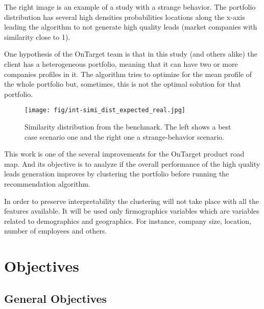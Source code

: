 The right image is an example of a study with a strange behavior. The portfolio distribution has several high densities probabilities locations along the x-axis leading the algorithm to not generate high quality leads (market companies with similarity close to 1). 

One hypothesis of the OnTarget team is that in this study (and others alike) the client has a heterogeneous portfolio, meaning that it can have two or more companies profiles in it. The algorithm tries to optimize for the mean profile of the whole portfolio but, sometimes, this is not the optimal solution for that portfolio.

\begin{figure}
   \centering
   \texttt{[image: fig/int-simi\_dist\_expected\_real.jpg]} 
   \caption{Similarity distribution from the benchmark. The left shows a best case scenario one and the right one a strange-behavior scenario.}
   \label{fig:simi_dist_expected_real}
\end{figure}

This work is one of the several improvements for the OnTarget product road map. And its objective is to analyze if the overall performance of the high quality leads generation improves by clustering the portfolio before running the recommendation algorithm. 

In order to preserve interpretability the clustering will not take place with all the features available. It will be used only firmographics \cite{wikipedia_firmographics} variables which are variables related to demographics and geographics. For instance, company size, location, number of employees and others. 


\section{Objectives}

\subsection{General Objectives}

